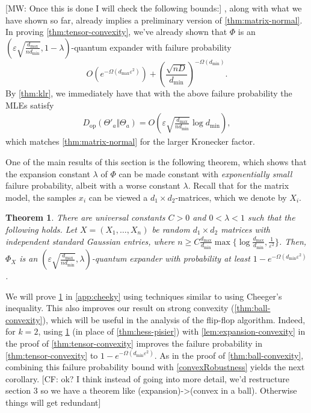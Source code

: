 \documentclass[aos]{imsart}
\newtheorem{theorem}{Theorem}[section]
\theoremstyle{definition}
\numberwithin{equation}{section}
\DeclareMathOperator{\op}{op}
\newcommand{\eps}{\varepsilon}
\newcommand{\CF}[1]{{\color{purple}[CF: #1]}}
\newcommand{\MW}[1]{{\color{red}[MW: #1]}}
\begin{document}
\MW{Once this is done I will check the following bounds:}
{\color{red}, along with what we have shown so far, already implies a preliminary version of \cref{thm:matrix-normal}.
In proving \cref{thm:tensor-convexity}, we've already shown that $\Phi$ is an $(\eps \sqrt{\frac{d_{\max}}{n d_{\min}}}, 1 - \lambda)$-quantum expander with failure probability
\[ O(e^{ - \Omega( d_{\max} \eps^2)}) + \left( \frac{\sqrt{nD}}{d_{\min}} \right)^{ - \Omega(d_{\min})}. \]
By \cref{thm:klr}, we immediately have that with the above failure probability the MLEs satisfy
\begin{align*}
  D_{\op}(\Theta'_a \Vert \Theta_a) = O\left(\eps \sqrt{\frac{d_{\max}}{n d_{\min}}} \log d_{\min}\right),
\end{align*}
which matches \cref{thm:matrix-normal} for the larger Kronecker factor.}

One of the main results of this section is the following theorem, which shows that the expansion constant $\lambda$ of $\Phi$ can be made constant with \emph{exponentially small} failure probability, albeit with a worse constant $\lambda$.
Recall that for the matrix model, the samples $x_i$ can be viewed a $d_1 \times d_2$-matrices, which we denote by $X_i$.

\begin{theorem}\label{thm:operator-cheeger}
There are universal constants $C > 0$ and $0<\lambda<1$ such that the following holds.
Let $X=(X_1,\dots,X_n)$ be random $d_1 \times d_2$ matrices with independent standard Gaussian entries, where $n \geq C \frac{d_{\max}}{d_{\min}} \max\{\log \frac{d_{\max}}{d_{\min}}, \frac1{\eps^2} \}$.
Then, $\Phi_X$ is an $(\eps \sqrt{\frac{d_{\max}}{n d_{\min}}}, \lambda)$-quantum expander with probability at least $1 - e^{ - \Omega( d_{\min} \eps^2)}$.
\end{theorem}

We will prove \cref{thm:operator-cheeger} in \cref{app:cheeky} using techniques similar to \cite{FM20} using Cheeger's inequality.
This also improves our result on strong convexity (\cref{thm:ball-convexity}), which will be useful in the analysis of the flip-flop algorithm. Indeed, for $k = 2$, using \cref{thm:operator-cheeger} (in place of \cref{thm:hess-pisier}) with \cref{lem:expansion-convexity} in the proof of \cref{thm:tensor-convexity} improves the failure probability in \cref{thm:tensor-convexity} to $1 - e^{ - \Omega( d_{\min} \eps^2)}$. As in the proof of \cref{thm:ball-convexity}, combining this failure probability bound with \cref{convexRobustness} yields the next corollary. \CF{ok? I think instead of going into more detail, we'd restructure section 3 so we have a theorem like (expansion)->(convex in a ball). Otherwise things will get redundant}
\end{document}
